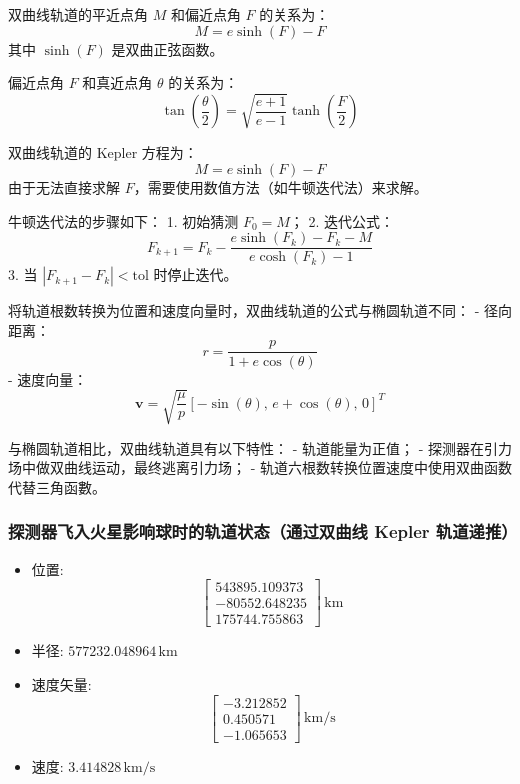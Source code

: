 \documentclass[12pt,a4paper]{article}
\begin{document}
双曲线轨道的平近点角 \(M\) 和偏近点角 \(F\) 的关系为：
\begin{equation}
    M = e \sinh(F) - F
\end{equation}
其中 \(\sinh(F)\) 是双曲正弦函数。

偏近点角 \(F\) 和真近点角 \(\theta\) 的关系为：
\begin{equation}
    \tan\left(\frac{\theta}{2}\right) = \sqrt{\frac{e + 1}{e - 1}} \tanh\left(\frac{F}{2}\right)
\end{equation}

双曲线轨道的 Kepler 方程为：
\begin{equation}
    M = e \sinh(F) - F
\end{equation}
由于无法直接求解 \(F\)，需要使用数值方法（如牛顿迭代法）来求解。

牛顿迭代法的步骤如下：
1. 初始猜测 \(F_0 = M\)；
2. 迭代公式：
   \begin{equation}
       F_{k+1} = F_k - \frac{e \sinh(F_k) - F_k - M}{e \cosh(F_k) - 1}
   \end{equation}
3. 当 \(|F_{k+1} - F_k| < \text{tol}\) 时停止迭代。

将轨道根数转换为位置和速度向量时，双曲线轨道的公式与椭圆轨道不同：
- 径向距离：
  \begin{equation}
      r = \frac{p}{1 + e \cos(\theta)}
  \end{equation}
- 速度向量：
  \begin{equation}
      \mathbf{v} = \sqrt{\frac{\mu}{p}} \left[ -\sin(\theta), \, e + \cos(\theta), \, 0 \right]^T
  \end{equation}

与椭圆轨道相比，双曲线轨道具有以下特性：
- 轨道能量为正值；
- 探测器在引力场中做双曲线运动，最终逃离引力场；
- 轨道六根数转换位置速度中使用双曲函数代替三角函數。





\subsubsection{探测器飞入火星影响球时的轨道状态（通过双曲线 Kepler 轨道递推）}
\begin{itemize}
    \item 位置: 
    \[
    \begin{bmatrix}
        543895.109373 \\ -80552.648235 \\ 175744.755863
    \end{bmatrix} \, \text{km}
    \]
    \item 半径: \(577232.048964 \, \text{km}\)
    \item 速度矢量: 
    \[
    \begin{bmatrix}
        -3.212852 \\ 0.450571 \\ -1.065653
    \end{bmatrix} \, \text{km/s}
    \]
    \item 速度: \(3.414828 \, \text{km/s}\)
\end{itemize}
\end{document}
